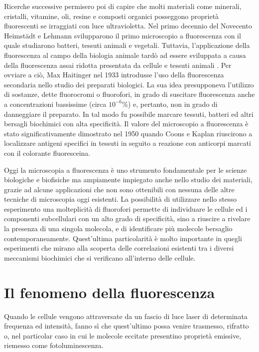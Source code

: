 Ricerche successive permisero poi di capire che molti materiali come minerali, cristalli, vitamine, oli, resine e composti organici posseggono proprietà fluorescenti se irraggiati con luce ultravioletta. 
Nel primo decennio del Novecento Heimstädt e Lehmann svilupparono il primo microscopio a fluorescenza con il quale studiarono batteri, tessuti animali e vegetali. 
Tuttavia, l'applicazione della fluorescenza al campo della biologia animale tardò ad essere sviluppata a causa della fluorescenza assai ridotta presentata da cellule e tessuti animali \cite{storia}. 
Per ovviare a ciò, Max Haitinger nel 1933 introdusse l'uso della fluorescenza secondaria nello studio dei preparati biologici. 
La sua idea presupponeva l'utilizzo di sostanze, dette fluorocromi o fluorofori, in grado di suscitare fluorescenza anche a concentrazioni bassissime (circa $10^{-6}$\%) e, pertanto, non in grado di danneggiare il preparato. 
In tal modo fu possibile marcare tessuti, batteri ed altri bersagli biochimici con alta specificità. 
Il valore del microscopio a fluorescenza è stato significativamente dimostrato nel 1950 quando Coons e Kaplan riuscirono a localizzare antigeni specifici in tessuti in seguito a reazione con anticorpi marcati con il colorante fluoresceina.

Oggi la microscopia a fluorescenza è uno strumento fondamentale per le scienze biologiche e biofisiche ma ampiamente impiegato anche nello studio dei materiali, grazie ad alcune applicazioni che non sono ottenibili con nessuna delle altre tecniche di microscopia oggi esistenti. 
La possibilità di utilizzare nello stesso esperimento una molteplicità di fluorofori permette di individuare le cellule ed i componenti subcellulari con un alto grado di specificità, sino a riuscire a rivelare la presenza di una singola molecola, e di identificare più molecole bersaglio contemporaneamente.
Quest'ultima particolarità è molto importante in quegli esperimenti che mirano alla scoperta delle correlazioni esistenti tra i diversi meccanismi biochimici che si verificano all'interno delle cellule.


\section{Il fenomeno della fluorescenza}

Quando le cellule vengono attraversate da un fascio di luce laser di determinata frequenza ed intensità, fanno sì che quest'ultimo possa venire trasmesso, rifratto o, nel particolar caso in cui le molecole eccitate presentino proprietà emissive, riemesso come fotoluminescenza. 

